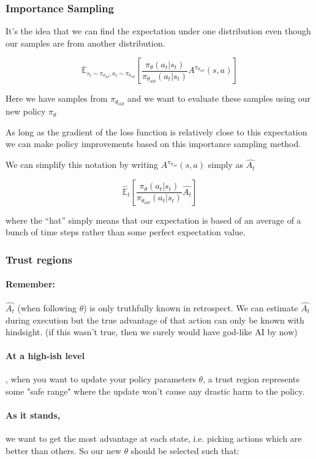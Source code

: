 \documentclass{article}
\begin{document}
\subsubsection{Importance Sampling}
It's the idea that we can find the expectation under one distribution even though our samples are from another distribution.

\[
    \mathbb{E}_{s_t \sim \pi_{\theta_{old}}, a_t \sim \pi_{\theta_{old}} } \left [ \frac{{\pi_\theta} (a_t|s_t)}{{\pi_{\theta_{old}}} (a_t|s_t)} A^{\pi_{\theta_{old}}} (s,a) \right]
\]

Here we have samples from \( \pi_{\theta_{old}} \) and we want to evaluate these samples using our new policy \( \pi_\theta \) 

As long as the gradient of the loss function is relatively close to this expectation we can make policy improvements based on this importance sampling method.

We can simplify this notation by writing \(A^{\pi_{\theta_{old}}} (s,a)\) simply as \( \hat{A_t} \)

\[
    \hat{\mathbb{E}}_{t} \left [ \frac{{\pi_\theta} (a_t|s_t)}{{\pi_{\theta_{old}}} (a_t|s_t)} \hat{A_t} \right]
\]

where the “hat” simply means that our expectation is based of an average of a bunch of time steps rather than some perfect expectation value.

\subsubsection{Trust regions}

\paragraph{Remember:} \( \hat{A_t} \) (when following \( \theta \)) is only truthfully known in retrospect. We can estimate \( \hat{A_t} \) during execution but the true advantage of that action can only be known with hindsight. (if this wasn't true, then we surely would have god-like AI by now)

\paragraph{At a high-ish level}, when you want to update your policy parameters \( \theta \), a trust region represents some "safe range" where the update won't cause any drastic harm to the policy.

\paragraph{As it stands,} we want to get the most advantage at each state, i.e. picking actions which are better than others. So our new \( \theta \) should be selected such that:
\end{document}
